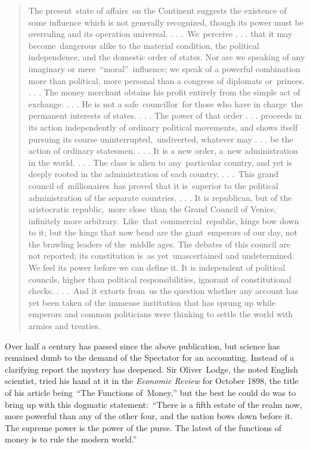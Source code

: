 \documentclass[twoside,symmetric,nobib,justified]{tufte-book}
\begin{document}
\begin{quote}
The present~state of affairs~on the Continent suggests the existence of
some influence which is not generally recognized, though its power must
be overruling and its operation universal. . . .~We~perceive . . . that
it may become~dangerous alike to the material condition, the political
independence, and the domestic order of states. Nor are we speaking of
any imaginary or mere~``moral''~influence; we speak of a powerful
combination more than political, more personal than a congress of
diplomats or~princes. . . . The money merchant obtains his profit
entirely from the simple act of exchange. . . . He is not a
safe~councillor~for those who have in charge~the permanent interests of
states. . . . The power of that order . . . proceeds in its action
independently of ordinary political movements, and shows itself pursuing
its course uninterrupted,~undiverted, whatever may . . . be the action
of ordinary statesmen. . . . It is a new order, a~new administration in
the world. . . . The class is alien to any~particular country, and yet
is deeply rooted in the administration of each country. . . .~This grand
council of~millionaires~has proved that it is~superior to the political
administration of the separate countries. . . . It is republican, but of
the aristocratic republic,~more close~than the Grand Council of Venice,
infinitely more arbitrary.~Like~that commercial~republic, kings bow down
to it; but the kings that now bend are the giant~emperors of our day,
not the brawling leaders of the~middle ages. The debates of this council
are not reported; its constitution is~as yet~unascertained and
undetermined. We feel its power before we can define it. It is
independent of political councils, higher than political
responsibilities, ignorant of constitutional checks. . . .~And it
extorts from~us the question whether any account has yet been taken of
the immense institution that has sprung up while emperors and common
politicians were thinking to settle the world with armies and treaties.
\end{quote}
\enlargethispage{\baselineskip}
Over half a century has passed since the above publication, but science
has remained dumb to the demand of the Spectator for an accounting.
Instead of a clarifying report the mystery has deepened. Sir
Oliver~Lodge, the noted English scientist, tried his hand at it in the
\emph{Economic Review} for October 1898, the title of his article
being~``The Functions of~Money,'' but the best he could do was to bring
up with this dogmatic statement:~``There is a fifth estate of the realm
now, more powerful than any of the other four, and the nation bows down
before it. The supreme power is the power of the purse. The latest of
the functions of money is to rule the modern world.''~
\end{document}
